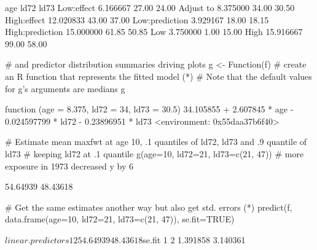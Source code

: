 \begin{Schunk}
\begin{Soutput}
                      age  ld72  ld73
Low:effect       6.166667 27.00 24.00
Adjust to        8.375000 34.00 30.50
High:effect     12.020833 43.00 37.00
Low:prediction   3.929167 18.00 18.15
High:prediction 15.000000 61.85 50.85
Low              3.750000  1.00 15.00
High            15.916667 99.00 58.00
\end{Soutput}
\begin{Sinput}
                      # and predictor distribution summaries driving plots
g <- Function(f)  # create an R function that represents the fitted model (*\ipacue*)
# Note that the default values for g's arguments are medians
g
\end{Sinput}
\begin{Soutput}
function (age = 8.375, ld72 = 34, ld73 = 30.5) 
{
    34.105855 + 2.607845 * age - 0.024597799 * ld72 - 0.23896951 * 
        ld73
}
<environment: 0x55daa37b6f40>
\end{Soutput}
\begin{Sinput}
# Estimate mean maxfwt at age 10, .1 quantiles of ld72, ld73 and .9 quantile of ld73
# keeping ld72 at .1 quantile
g(age=10, ld72=21, ld73=c(21, 47))  # more exposure in 1973 decreased y by 6
\end{Sinput}
\begin{Soutput}
[1] 54.64939 48.43618
\end{Soutput}
\begin{Sinput}
# Get the same estimates another way but also get std. errors (*\ipacue*)
predict(f, data.frame(age=10, ld72=21, ld73=c(21, 47)), se.fit=TRUE)
\end{Sinput}
\begin{Soutput}
$linear.predictors
       1        2 
54.64939 48.43618 

$se.fit
       1        2 
1.391858 3.140361 
\end{Soutput}
\end{Schunk}

